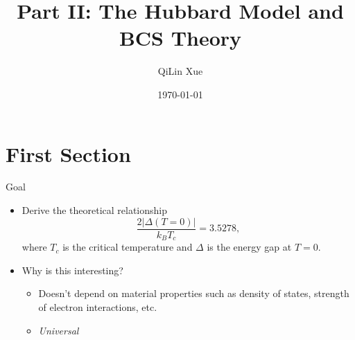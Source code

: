 \documentclass[aspectratio=169,xcolor=dvipsnames]{beamer}
\title[short title]{Part II: The Hubbard Model and BCS Theory}
\author{QiLin Xue}
\institute[UofT] %
{
    University of Toronto
    \vskip 3pt
}
\date{\today} %
\begin{document}
\begin{frame}
    \titlepage
\end{frame}
\section{First Section}

\begin{frame}{Goal}
    \begin{itemize}
        \item Derive the theoretical relationship
        \begin{equation*}
            \frac{2|\Delta(T=0)|}{k_BT_c}=3.5278,
        \end{equation*}
        where $T_c$ is the critical temperature and $\Delta$ is the energy gap at $T=0.$
        \item Why is this interesting?
        \begin{itemize}
            \item Doesn't depend on material properties such as density of states, strength of electron interactions, etc.
            \item \textit{Universal}
        \end{itemize} 
    \end{itemize}
\end{frame}
\end{document}
